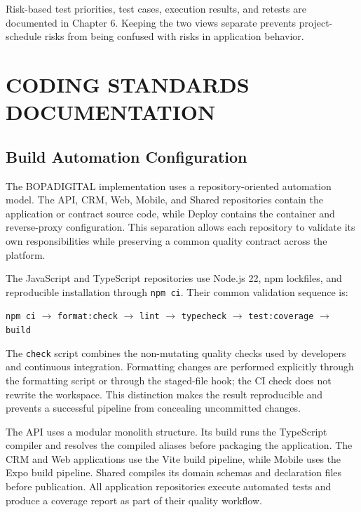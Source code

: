 \documentclass[letterpaper%
, oneside%
, 12pt%
, memoireprojet%
, english%
,creativecommons,hyperref, withAlgo2e %
]{thETS}
\begin{document}
Risk-based test priorities, test cases, execution results, and retests are documented in
Chapter 6. Keeping the two views separate prevents project-schedule risks from being confused
with risks in application behavior.

\chapter{CODING STANDARDS DOCUMENTATION}
\label{chap:chapter4_standards}

\section{Build Automation Configuration}
The BOPADIGITAL implementation uses a repository-oriented automation model. The API, CRM, Web,
Mobile, and Shared repositories contain the application or contract source code, while Deploy
contains the container and reverse-proxy configuration. This separation allows each repository to
validate its own responsibilities while preserving a common quality contract across the platform.

The JavaScript and TypeScript repositories use Node.js 22, npm lockfiles, and reproducible
installation through \texttt{npm ci}. Their common validation sequence is:

\begin{center}
\texttt{npm ci} $\rightarrow$ \texttt{format:check} $\rightarrow$ \texttt{lint}
$\rightarrow$ \texttt{typecheck} $\rightarrow$ \texttt{test:coverage} $\rightarrow$ \texttt{build}
\end{center}

The \texttt{check} script combines the non-mutating quality checks used by developers and
continuous integration. Formatting changes are performed explicitly through the formatting script
or through the staged-file hook; the CI check does not rewrite the workspace. This distinction makes
the result reproducible and prevents a successful pipeline from concealing uncommitted changes.

The API uses a modular monolith structure. Its build runs the TypeScript compiler and resolves the
compiled aliases before packaging the application. The CRM and Web applications use the Vite build
pipeline, while Mobile uses the Expo build pipeline. Shared compiles its domain schemas and
declaration files before publication. All application repositories execute automated tests and
produce a coverage report as part of their quality workflow.
\end{document}
